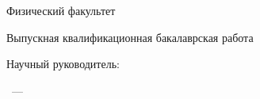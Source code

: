\thispagestyle{empty}%

\begin{center}%
\MakeUppercase{\thesisMO}
\end{center}%

\begin{center}%
\MakeUppercase{\thesisOrganization}
\end{center}%
%
\vspace{0pt plus4fill} %

%

\vspace{0pt plus1fill} %
\begin{center}%
\large Физический факультет
\vspace{0pt plus2fill}

Выпускная квалификационная бакалаврская работа

{%
\vspace{0pt plus2fill} %

\thesisSpecialtyTitle
}
\end{center}%

\vspace{0pt plus4fill} %
\begin{center}%
{\thesisAuthor}
\end{center}%
%
\vspace{0pt plus1fill} %
\begin{center}%
\large{\textbf {\thesisTitle}}

\thesisDegree
\end{center}%
%
\vspace{0pt plus4fill} %
\begin{flushright}%
Научный руководитель:

\supervisorRegalia

\supervisorFio
\end{flushright}%
%
\vspace{0pt plus4fill} %
\begin{center}%
{\thesisCity~--- \thesisYear}
\end{center}%
\newpage
